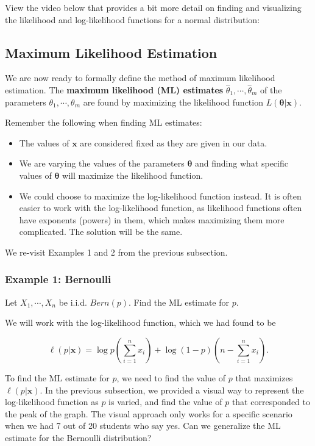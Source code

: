 \documentclass[
]{book}
\providecommand{\tightlist}{%
  \setlength{\itemsep}{0pt}\setlength{\parskip}{0pt}}
\begin{document}
View the video below that provides a bit more detail on finding and visualizing the likelihood and log-likelihood functions for a normal distribution:

\hypertarget{maximum-likelihood-estimation}{%
\subsection{Maximum Likelihood Estimation}\label{maximum-likelihood-estimation}}

We are now ready to formally define the method of maximum likelihood estimation. The \textbf{maximum likelihood (ML) estimates} \(\hat{\theta}_1, \cdots, \hat{\theta}_m\) of the parameters \(\theta_1, \cdots, \theta_m\) are found by maximizing the likelihood function \(L(\boldsymbol{\theta} | \boldsymbol{x} )\).

Remember the following when finding ML estimates:

\begin{itemize}
\tightlist
\item
  The values of \(\boldsymbol{x}\) are considered fixed as they are given in our data.
\item
  We are varying the values of the parameters \(\boldsymbol{\theta}\) and finding what specific values of \(\boldsymbol{\theta}\) will maximize the likelihood function.
\item
  We could choose to maximize the log-likelihood function instead. It is often easier to work with the log-likelihood function, as likelihood functions often have exponents (powers) in them, which makes maximizing them more complicated. The solution will be the same.
\end{itemize}

We re-visit Examples 1 and 2 from the previous subsection.

\hypertarget{example-1-bernoulli-1}{%
\subsubsection{Example 1: Bernoulli}\label{example-1-bernoulli-1}}

Let \(X_1, \cdots, X_n\) be i.i.d. \(Bern(p)\). Find the ML estimate for \(p\).

We will work with the log-likelihood function, which we had found to be

\[
\ell (p | \boldsymbol{x}) = \log p \left(\sum_{i=1}^n x_i \right) + \log (1-p) \left( n - \sum_{i=1}^n x_i \right).
\]

To find the ML estimate for \(p\), we need to find the value of \(p\) that maximizes \(\ell (p | \boldsymbol{x})\). In the previous subsection, we provided a visual way to represent the log-likelihood function as \(p\) is varied, and find the value of \(p\) that corresponded to the peak of the graph. The visual approach only works for a specific scenario when we had 7 out of 20 students who say yes. Can we generalize the ML estimate for the Bernoulli distribution?
\end{document}
